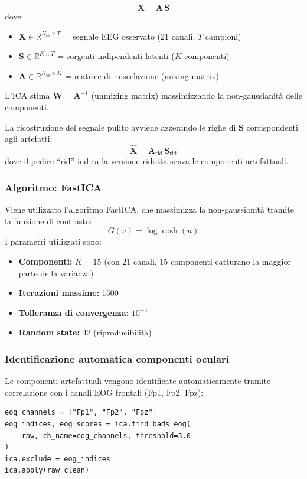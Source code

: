 \documentclass[12pt, a4paper]{article}
\begin{document}
\begin{formulabox}
\[
\mathbf{X} = \mathbf{A}\,\mathbf{S}
\]
dove:
\begin{itemize}[noitemsep]
    \item $\mathbf{X} \in \mathbb{R}^{N_\text{ch} \times T}$ = segnale EEG osservato (21 canali, $T$ campioni)
    \item $\mathbf{S} \in \mathbb{R}^{K \times T}$ = sorgenti indipendenti latenti ($K$ componenti)
    \item $\mathbf{A} \in \mathbb{R}^{N_\text{ch} \times K}$ = matrice di miscelazione (mixing matrix)
\end{itemize}
L'ICA stima $\mathbf{W} = \mathbf{A}^{-1}$ (unmixing matrix) massimizzando la non-gaussianità delle componenti.
\end{formulabox}

La ricostruzione del segnale pulito avviene azzerando le righe di $\mathbf{S}$ corrispondenti agli artefatti:
\[
\hat{\mathbf{X}} = \mathbf{A}_\text{rid}\,\mathbf{S}_\text{rid}
\]
dove il pedice ``rid'' indica la versione ridotta senza le componenti artefattuali.

\subsubsection{Algoritmo: FastICA}
Viene utilizzato l'algoritmo FastICA, che massimizza la non-gaussianità tramite la funzione di contrasto:
\[
G(u) = \log\cosh(u)
\]
I parametri utilizzati sono:
\begin{itemize}[noitemsep]
    \item \textbf{Componenti:} $K = 15$ (con 21 canali, 15 componenti catturano la maggior parte della varianza)
    \item \textbf{Iterazioni massime:} 1500
    \item \textbf{Tolleranza di convergenza:} $10^{-4}$
    \item \textbf{Random state:} 42 (riproducibilità)
\end{itemize}

\subsubsection{Identificazione automatica componenti oculari}
Le componenti artefattuali vengono identificate automaticamente tramite correlazione con i canali EOG frontali (Fp1, Fp2, Fpz):

\begin{lstlisting}[caption={Identificazione e rimozione componenti EOG}]
eog_channels = ["Fp1", "Fp2", "Fpz"]
eog_indices, eog_scores = ica.find_bads_eog(
    raw, ch_name=eog_channels, threshold=3.0
)
ica.exclude = eog_indices
ica.apply(raw_clean)
\end{lstlisting}
\end{document}
